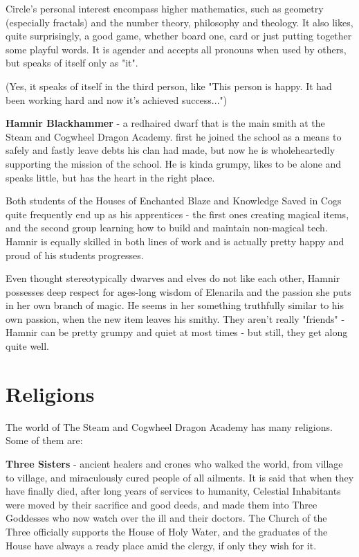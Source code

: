 \documentclass[a4paper,11pt]{article}
\begin{document}
Circle's personal interest encompass higher mathematics, such as geometry (especially fractals) and the number theory, philosophy and theology. It also likes, quite surprisingly, a good game, whether board one, card or just putting together some playful words. It is agender and accepts all pronouns when used by others, but speaks of itself only as "it".

(Yes, it speaks of itself in the third person, like "This person is happy. It had been working hard and now it's achieved success...")

\textbf{Hamnir Blackhammer} - a redhaired dwarf that is the main smith at the Steam and Cogwheel Dragon Academy. first he joined the school as a means to safely and fastly leave debts his clan had made, but now he is wholeheartedly supporting the mission of the school. He is kinda grumpy, likes to be alone and speaks little, but has the heart in the right place. 

Both students of the Houses of Enchanted Blaze and Knowledge Saved in Cogs quite frequently end up as his apprentices - the first ones creating magical items, and the second group learning how to build and maintain non-magical tech. Hamnir is equally skilled in both lines of work and is actually pretty happy and proud of his students progresses. 

Even thought stereotypically dwarves and elves do not like each other, Hamnir possesses deep respect for ages-long wisdom of Elenarila and the passion she puts in her own branch of magic. He seems in her something truthfully similar to his own passion, when the new item leaves his smithy. They aren't really "friends" - Hamnir can be pretty grumpy and quiet at most times - but still, they get along quite well. 

\newpage

\section{Religions}

The world of The Steam and Cogwheel Dragon Academy has many religions. Some of them are:

\textbf{Three Sisters} - ancient healers and crones who walked the world, from village to village, and miraculously cured people of all ailments. It is said that when they have finally died, after long years of services to humanity, Celestial Inhabitants were moved by their sacrifice and good deeds, and made them into Three Goddesses who now watch over the ill and their doctors. The Church of the Three officially supports the House of Holy Water, and the graduates of the House have always a ready place amid the clergy, if only they wish for it.
\end{document}
